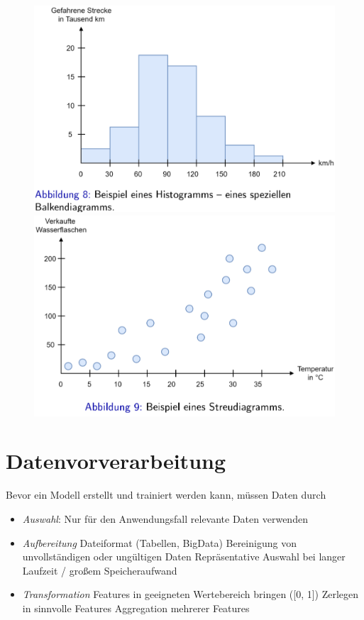 \documentclass{report}
\begin{document}
\begin{figure}[H]
  \centering
  \begin{minipage}[b]{0.4\textwidth}
    \includegraphics[scale=.25]{ml01_6}
  \end{minipage}
  \hfill
  \begin{minipage}[b]{0.4\textwidth}
    \includegraphics[scale=.25]{ml01_7}
  \end{minipage}
\end{figure}

\section{Datenvorverarbeitung}
Bevor ein Modell erstellt und trainiert werden kann, müssen Daten durch\\
\vspace*{-1.5em}
\begin{itemize}
  \item \textit{Auswahl}: Nur für den Anwendungsfall relevante Daten verwenden
  \item \textit{Aufbereitung}
  \subitem Dateiformat (Tabellen, BigData)
  \subitem Bereinigung von unvollständigen oder ungültigen Daten
  \subitem Repräsentative Auswahl bei langer Laufzeit / großem Speicheraufwand
  \item \textit{Transformation}
  \subitem Features in geeigneten Wertebereich bringen ([0, 1])
  \subitem Zerlegen in sinnvolle Features
  \subitem Aggregation mehrerer Features
\end{itemize}
\end{document}

